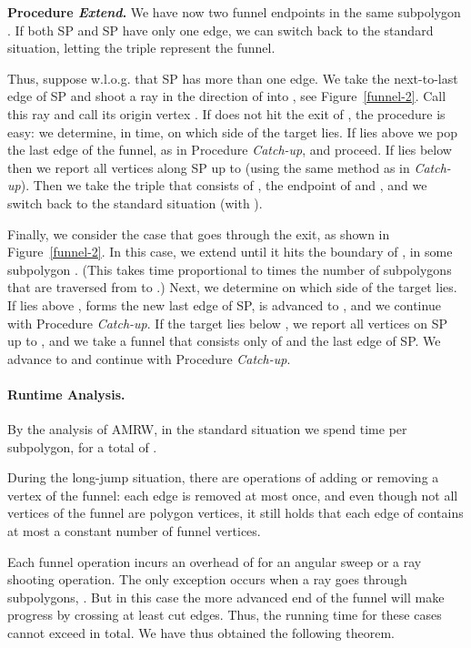 \documentclass[11pt,a4paper]{article}
\begin{document}
\noindent
\textbf{Procedure \emph{Extend}.}
We have now two funnel endpoints in the same subpolygon .
If both SP and SP have only one edge, we can switch back to
the standard situation, letting the triple  represent the funnel.

Thus, suppose w.l.o.g. that SP has more than one edge. We take
the next-to-last edge  of SP and shoot a ray in the direction of
 into , see Figure~\ref{funnel-2}. Call this ray  and call its origin
vertex .
If  does not hit the exit of ,
the procedure is easy:
we determine, in  time, on which side of  the target lies.
If  lies above  we pop the last edge of the funnel, as in
Procedure \emph{Catch-up}, and proceed.
If  lies below  then
we report all vertices along SP up to  (using the same method as
in \emph{Catch-up}).
Then we take the triple that consists of , the endpoint of  and
, and we switch back to the standard situation (with ).

Finally, we consider the case that  goes through the exit,
as shown in Figure~\ref{funnel-2}.
In this case, we extend  until it hits the boundary of ,
in some subpolygon .
(This takes time
proportional to  times the number of subpolygons that are
traversed from  to .)
Next, we determine on which side of  the target lies.
If  lies above ,  forms the new last edge of SP,
 is advanced to
, and we continue with Procedure \emph{Catch-up}.
If the target lies below , we report all vertices on SP
up to , and we take a funnel that consists
only of  and the last edge of SP.
We advance  to
 and continue with Procedure \emph{Catch-up}.


\paragraph{Runtime Analysis.}

By the analysis of AMRW, in the standard situation we spend
 time per subpolygon,
for a total of .

During the long-jump situation, there are  operations of
adding or removing a vertex of the funnel: each edge is removed at most once,
and even though not all vertices of the funnel are polygon vertices, it still holds
that each edge of  contains at most a constant number of funnel vertices.

Each funnel operation incurs an overhead of   for an
angular sweep or a ray shooting operation.
The only exception occurs when a ray goes through  subpolygons,
. But in this case the more advanced end of the funnel will
make progress by crossing at least  cut edges. Thus, the running
time  for these cases cannot exceed
 in total.
We have thus obtained the following theorem.
\end{document}

